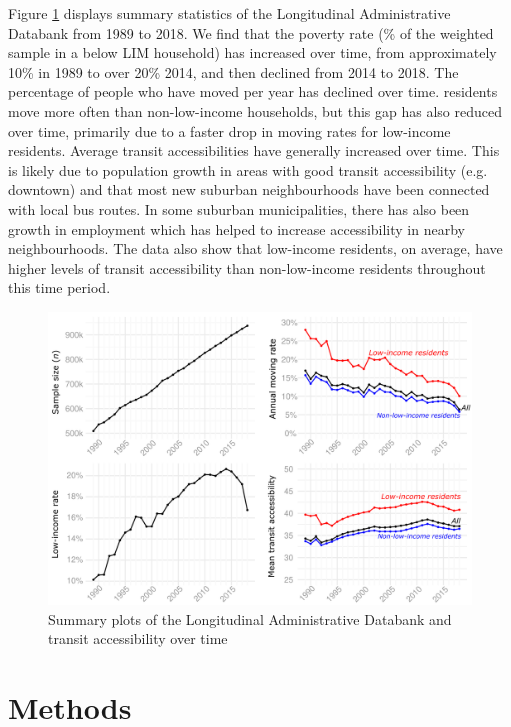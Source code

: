 Figure \ref{fig:4plots} displays summary statistics of the Longitudinal Administrative Databank from 1989 to 2018. We find that the poverty rate (\% of the weighted sample in a below LIM household) has increased over time, from approximately 10\% in 1989 to over 20\% 2014, and then declined from 2014 to 2018. The percentage of people who have moved per year has declined over time.  residents move more often than non-low-income households, but this gap has also reduced over time, primarily due to a faster drop in moving rates for low-income residents. Average transit accessibilities have generally increased over time. This is likely due to population growth in areas with good transit accessibility (e.g. downtown) and that most new suburban neighbourhoods have been connected with local bus routes. In some suburban municipalities, there has also been growth in employment which has helped to increase accessibility in nearby neighbourhoods. The data also show that low-income residents, on average, have higher levels of transit accessibility than non-low-income residents throughout this time period.


\begin{figure}[H]
	\centering
	\includegraphics[width=1\linewidth]{figures/4plots.png}
	\caption[]{Summary plots of the Longitudinal Administrative Databank and transit accessibility over time}
	\label{fig:4plots}
\end{figure}




\section{Methods}


